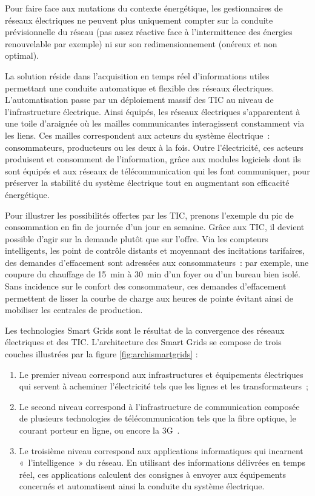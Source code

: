 Pour faire face aux mutations du contexte énergétique, les gestionnaires de 
réseaux électriques ne peuvent plus uniquement compter sur la conduite 
prévisionnelle du réseau (pas assez réactive face à l'intermittence des énergies 
renouvelable par exemple) ni sur son redimensionnement (onéreux et non optimal). 

La solution réside dans l'acquisition en temps réel d'informations utiles 
permettant une conduite automatique et flexible des réseaux électriques. 
L'automatisation passe par un déploiement massif des TIC au niveau de 
l'infrastructure électrique. Ainsi équipés, les réseaux électriques 
s'apparentent à une toile d'araignée où les mailles communicantes interagissent 
constamment via les liens. Ces mailles correspondent aux acteurs du système 
électrique~: consommateurs, producteurs ou les deux à la fois. 
Outre l'électricité, ces acteurs produisent et consomment de l'information, 
grâce aux modules logiciels dont ils sont équipés et aux réseaux de 
télécommunication qui les font communiquer, pour préserver la stabilité du 
système électrique tout en augmentant son efficacité énergétique. 

Pour illustrer les possibilités offertes par les TIC, prenons l'exemple du pic 
de consommation en fin de journée d'un jour en semaine. Grâce aux TIC, il 
devient possible d'agir sur la demande plutôt que sur l'offre. Via les compteurs 
intelligents, les point de contrôle distants et moyennant des incitations 
tarifaires, des demandes d'effacement sont adressées aux consommateurs~: par 
exemple, une coupure du chauffage de 15~min à 30~min d'un foyer ou d'un bureau 
bien isolé. Sans incidence sur le confort des consommateur, ces demandes 
d'effacement permettent de lisser la courbe de charge aux heures de pointe 
évitant ainsi de mobiliser les centrales de production. 

Les technologies Smart Grids sont le résultat de la convergence des réseaux 
électriques et des TIC. L'architecture des Smart Grids se compose de trois 
couches illustrées par la figure \ref{fig:archismartgrids} :
\begin{enumerate}
\item Le premier niveau correspond aux infrastructures et équipements 
électriques qui servent à acheminer l'électricité tels que les lignes et les 
transformateurs~; 
\item Le second niveau correspond à l'infrastructure de communication composée 
de plusieurs technologies de télécommunication tels que la fibre optique, le 
courant porteur en ligne, ou encore la 3G~. 
\item Le troisième niveau correspond aux applications informatiques qui 
incarnent «~l'intelligence~» du réseau.  En utilisant des informations délivrées 
en temps réel, ces applications calculent des consignes à envoyer aux 
équipements concernés et automatisent ainsi la conduite du système électrique.
\end{enumerate}



